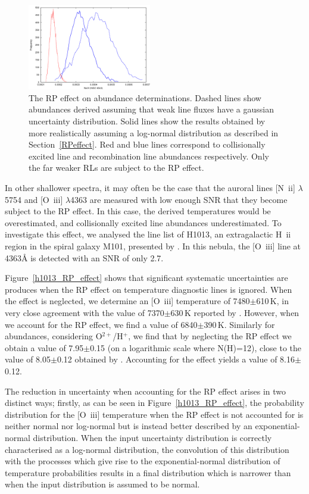 \documentclass[useAMS,usenatbib]{mn2e}
\begin{document}
\begin{figure}
\includegraphics[width=0.48\textwidth]{figures/ngc6543_ne_rpeffect_simpler.png}
\caption{The RP effect on abundance determinations.  Dashed lines show abundances derived assuming that weak line fluxes have a gaussian uncertainty distribution.  Solid lines show the results obtained by more realistically assuming a log-normal distribution as described in Section~\ref{RPeffect}.  Red and blue lines correspond to collisionally excited line and recombination line abundances respectively.  Only the far weaker RLs are subject to the RP effect.}
\label{RP_figures}
\end{figure}

In other shallower spectra, it may often be the case that the auroral lines [N~{\sc ii}] $\lambda$5754 and [O~{\sc iii}] $\lambda$4363 are measured with low enough SNR that they become subject to the RP effect.  In this case, the derived temperatures would be overestimated, and collisionally excited line abundances underestimated.  To investigate this effect, we analysed the line list of H1013, an extragalactic H~{\sc ii} region in the spiral galaxy M101, presented by \citet{2009ApJ...700..654E}.  In this nebula, the [O~{\sc iii}] line at 4363{\AA} is detected with an SNR of only 2.7.

Figure~\ref{h1013_RP_effect} shows that significant systematic uncertainties are produces when the RP effect on temperature diagnostic lines is ignored.  When the effect is neglected, we determine an [O~{\sc iii}] temperature of 7480$\pm$610\,K, in very close agreement with the value of 7370$\pm$630\,K reported by \citet{2009ApJ...700..654E}.  However, when we account for the RP effect, we find a value of 6840$\pm$390\,K.  Similarly for abundances, considering O$^{2+}$/H$^+$, we find that by neglecting the RP effect we obtain a value of 7.95$\pm$0.15 (on a logarithmic scale where N(H)=12), close to the value of 8.05$\pm$0.12 obtained by \citet{2009ApJ...700..654E}.  Accounting for the effect yields a value of 8.16$\pm$0.12.

The reduction in uncertainty when accounting for the RP effect arises in two distinct ways; firstly, as can be seen in Figure~\ref{h1013_RP_effect}, the probability distribution for the [O~{\sc iii}] temperature when the RP effect is not accounted for is neither normal nor log-normal but is instead better described by an exponential-normal distribution.  When the input uncertainty distribution is correctly characterised as a log-normal distribution, the convolution of this distribution with the processes which give rise to the exponential-normal distribution of temperature probabilities results in a final distribution which is narrower than when the input distribution is assumed to be normal.
\end{document}
